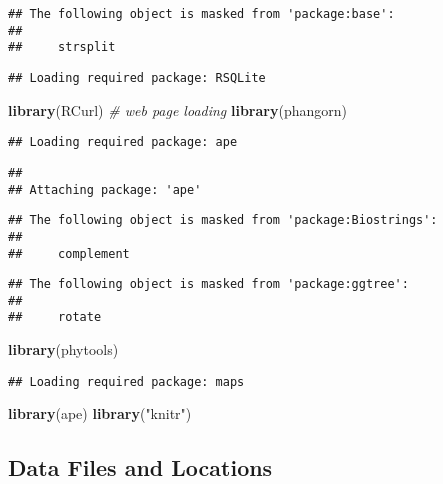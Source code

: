 \documentclass[
]{article}
\newenvironment{Shaded}{\begin{snugshade}}{\end{snugshade}}
\newcommand{\CommentTok}[1]{\textcolor[rgb]{0.56,0.35,0.01}{\textit{#1}}}
\newcommand{\KeywordTok}[1]{\textcolor[rgb]{0.13,0.29,0.53}{\textbf{#1}}}
\newcommand{\NormalTok}[1]{#1}
\newcommand{\StringTok}[1]{\textcolor[rgb]{0.31,0.60,0.02}{#1}}
\begin{document}
\begin{verbatim}
## The following object is masked from 'package:base':
## 
##     strsplit
\end{verbatim}

\begin{verbatim}
## Loading required package: RSQLite
\end{verbatim}

\begin{Shaded}
\begin{Highlighting}[]
\KeywordTok{library}\NormalTok{(RCurl) }\CommentTok{# web page loading}
\KeywordTok{library}\NormalTok{(phangorn)}
\end{Highlighting}
\end{Shaded}

\begin{verbatim}
## Loading required package: ape
\end{verbatim}

\begin{verbatim}
## 
## Attaching package: 'ape'
\end{verbatim}

\begin{verbatim}
## The following object is masked from 'package:Biostrings':
## 
##     complement
\end{verbatim}

\begin{verbatim}
## The following object is masked from 'package:ggtree':
## 
##     rotate
\end{verbatim}

\begin{Shaded}
\begin{Highlighting}[]
\KeywordTok{library}\NormalTok{(phytools)}
\end{Highlighting}
\end{Shaded}

\begin{verbatim}
## Loading required package: maps
\end{verbatim}

\begin{Shaded}
\begin{Highlighting}[]
\KeywordTok{library}\NormalTok{(ape)}
\KeywordTok{library}\NormalTok{(}\StringTok{"knitr"}\NormalTok{)}
\end{Highlighting}
\end{Shaded}

\hypertarget{data-files-and-locations}{%
\subsection{Data Files and Locations}\label{data-files-and-locations}}
\end{document}
